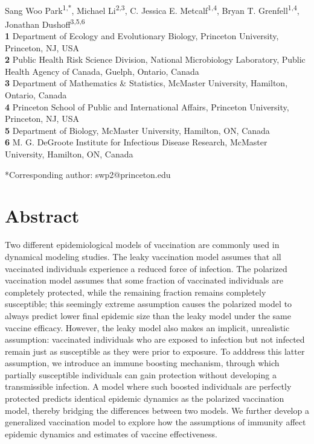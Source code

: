\documentclass[12pt]{article}
\date{\today}
\begin{document}
\begin{flushleft}{
	\Large
	\textbf{}
}
\newline
\\
Sang Woo Park\textsuperscript{1,*}, Michael Li\textsuperscript{2,3}, C. Jessica E. Metcalf\textsuperscript{1,4}, Bryan T. Grenfell\textsuperscript{1,4}, Jonathan Dushoff\textsuperscript{3,5,6}
\\
\bigskip
\textbf{1} Department of Ecology and Evolutionary Biology, Princeton University, Princeton, NJ, USA\\
\textbf{2} Public Health Risk Science Division, National Microbiology Laboratory, Public Health Agency of Canada, Guelph, Ontario, Canada\\
\textbf{3} Department of Mathematics \& Statistics, McMaster University, Hamilton, Ontario, Canada\\
\textbf{4} Princeton School of Public and International Affairs, Princeton University, Princeton, NJ, USA\\
\textbf{5} Department of Biology, McMaster University, Hamilton, ON, Canada\\
\textbf{6} M. G. DeGroote Institute for Infectious Disease Research, McMaster University, Hamilton, ON, Canada\\
\bigskip

*Corresponding author: swp2@princeton.edu
\end{flushleft}

\section*{Abstract}

Two different epidemiological models of vaccination are commonly used in dynamical modeling studies.
The leaky vaccination model assumes that all vaccinated individuals experience a reduced force of infection.
The polarized vaccination model assumes that some fraction of vaccinated individuals are completely protected, while the remaining fraction remains completely susceptible;
this seemingly extreme assumption causes the polarized model to always predict lower final epidemic size than the leaky model under the same vaccine efficacy.
However, the leaky model also makes an implicit, unrealistic assumption: 
vaccinated individuals who are exposed to infection but not infected remain just as susceptible as they were prior to exposure.
To adddress this latter assumption, we introduce an immune boosting mechanism, through which partially susceptible individuals can gain protection without developing a transmissible infection.
A model where such boosted individuals are perfectly protected predicts identical epidemic dynamics as the polarized vaccination model, thereby bridging the differences between two models.
We further develop a generalized vaccination model to explore how the assumptions of immunity affect epidemic dynamics and estimates of vaccine effectiveness.
\end{document}
